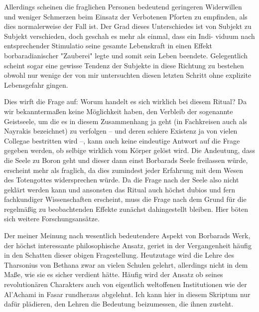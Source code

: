 \documentclass[11pt]{article}
\begin{document}
Allerdings scheinen die fraglichen Personen bedeutend geringeren Widerwillen und weniger Schmerzen
beim Einsatz der Verbotenen Pforten zu empfinden, als dies normalerweise der Fall ist. Der Grad dieses
Unterschiedes ist von Subjekt zu Subjekt verschieden, doch geschah es mehr als einmal, dass ein Indi-
viduum nach entsprechender Stimulatio seine gesamte Lebenskraft in einen Effekt borbaradianischer
"Zauberei" legte und somit sein Leben beendete. Gelegentlich scheint sogar eine gewisse Tendenz der
Subjekte in diese Richtung zu bestehen obwohl nur wenige der von mir untersuchten diesen letzten
Schritt ohne explizite Lebensgefahr gingen.

Dies wirft die Frage auf: Worum handelt es sich wirklich bei diesem Ritual? Da wir bekanntermaßen
keine Möglichkeit haben, den Verbleib der sogenannte Geistseele, um die es in diesem Zusammenhang
ja geht (in Fachkreisen auch als Nayrakis bezeichnet) zu verfolgen – und deren schiere Existenz ja von
vielen Collegae bestritten wird –, kann auch keine eindeutige Antwort auf die Frage gegeben werden, ob
selbige wirklich vom Körper gelöst wird. Die Andeutung, dass die Seele zu Boron geht und dieser dann
einst Borbarads Seele freilassen würde, erscheint mehr als fraglich, da dies zumindest jeder Erfahrung
mit dem Wesen des Totengottes widersprechen würde. Da die Frage nach der Seele also nicht geklärt
werden kann und ansonsten das Ritual auch höchst dubios und fern fachkundiger Wissenschaften erscheint, muss die Frage nach dem Grund für die regelmäßig zu beobachtenden Effekte zunächst dahingestellt bleiben. Hier böten sich weitere Forschungsansätze.

Der meiner Meinung nach wesentlich bedeutendere Aspekt von Borbarads Werk, der höchst interessante
philosophische Ansatz, geriet in der Vergangenheit häufig in den Schatten dieser obigen Fragestellung.
Heutzutage wird die Lehre des Tharsonius von Bethana zwar an vielen Schulen gelehrt, allerdings nicht
in dem Maße, wie sie es sicher verdient hätte. Häufig wird der Ansatz ob seines revolutionären Charakters auch von eigentlich weltoffenen Institutionen wie der Al'Achami in Fasar rundheraus abgelehnt. Ich
kann hier in diesem Skriptum nur dafür plädieren, den Lehren die Bedeutung beizumessen, die ihnen
zusteht.
\end{document}
